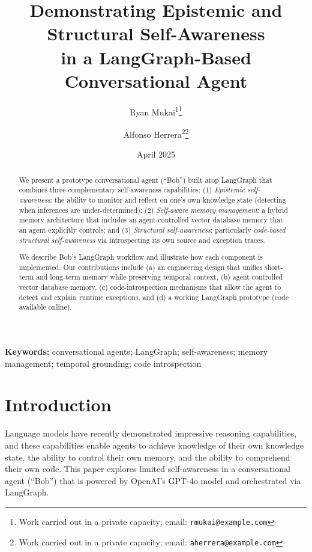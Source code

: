 \documentclass[11pt]{article}
\title{Demonstrating Epistemic and Structural Self-Awareness \\in a LangGraph-Based Conversational Agent}
\author{
  Ryan Mukai\textsuperscript{1}\thanks{Work carried out in a private capacity; email: \texttt{rmukai@example.com}} 
  \and
  Alfonso Herrera\textsuperscript{2}\thanks{Work carried out in a private capacity; email: \texttt{aherrera@example.com}}
}
\date{April 2025}
\begin{document}
\maketitle

\begin{abstract}
We present a prototype conversational agent (“Bob”) built atop LangGraph that combines three complementary self-awareness capabilities:
(1) \emph{Epistemic self-awareness}: the ability to monitor and reflect on one’s own knowledge state (detecting when inferences are under-determined);
(2) \emph{Self-aware memory management}: a hybrid memory architecture that includes an agent-controlled vector database memory that an agent explicitly controls; and
(3) \emph{Structural self-awareness}: particularly \emph{code-based structural self-awareness} via introspecting its own source and exception traces.

We describe Bob’s LangGraph workflow and illustrate how each component is implemented. Our contributions include (a) an engineering design that unifies short-term and long-term memory while preserving temporal context, (b) agent controlled vector database memory, (c) code-introspection mechanisms that allow the agent to detect and explain runtime exceptions, and (d) a working LangGraph prototype (code available online).
\end{abstract}

\textbf{Keywords:} conversational agents; LangGraph; self-awareness; memory management; temporal grounding; code introspection

\vspace{1em}


\section{Introduction}
Language models have recently demonstrated impressive reasoning capabilities, and these capabilities enable agents to achieve knowledge of their own knowledge state, the ability to control their own memory, and the ability to comprehend their own code. This paper explores limited self-awareness in a conversational agent (“Bob”) that is powered by OpenAI’s GPT-4o model and orchestrated via LangGraph.
\end{document}
